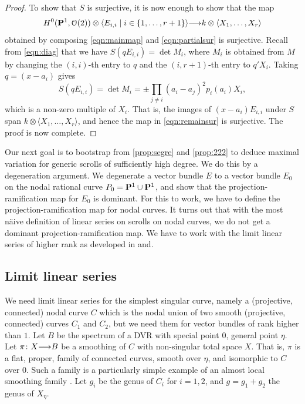 \documentclass[11pt,reqno]{amsart}
\theoremstyle{plain}
\theoremstyle{definition}
\theoremstyle{remark}
\numberwithin{equation}{section}
\renewcommand{\k}{k}
\renewcommand{\to}{{\longrightarrow}}
\numberwithin{equation}{section}
\renewcommand{\O}{\mathcal O}
\begin{document}
\begin{proof}
  To show that $S$ is surjective, it is now enough to show that the map
  \begin{equation}\label{eqn:remainsur}
    H^0(\P^1, \O(2)) \otimes \langle  E_{i,i} \mid i \in \{1, \dots, r+1\} \rangle \to \k \otimes \langle  X_1, \dots, X_r \rangle
  \end{equation}
  obtained by composing \eqref{eqn:mainmap} and \eqref{eqn:partialsur} is surjective.
  Recall from \eqref{eqn:diag} that we have $S(qE_{i,i}) = \det M_i$, where $M_i$ is obtained from $M$ by changing the $(i,i)$-th entry to $q$ and the $(i, r+1)$-th entry to $q'X_i$.
  Taking $q = (x-a_i)$ gives
  \[ S(qE_{i,i}) = \det M_i = \pm \prod_{j \neq i} (a_i-a_j)^2 p_i(a_i) X_i,\]
  which is a non-zero multiple of $X_i$.
  That is, the images of $(x-a_i)E_{i,i}$ under $S$ span $\k \otimes \langle  X_1, \dots, X_r \rangle$, and hence the map in \eqref{eqn:remainsur} is surjective.
  The proof is now complete.
\end{proof}

Our next goal is to bootstrap from \autoref{prop:segre} and \autoref{prop:222} to deduce maximal variation for generic scrolls of sufficiently high degree.
We do this by a degeneration argument.
We degenerate a vector bundle $E$ to a vector bundle $E_0$ on the nodal rational curve $P_0 = \P^1 \cup \P^1$, and show that the projection-ramification map for $E_0$ is dominant.
For this to work, we have to define the projection-ramification map for nodal curves.
It turns out that with the most n\"aive definition of linear series on scrolls on nodal curves, we do not get a dominant projection-ramification map.
We have to work with the limit linear series of higher rank as developed in \cite{tei-i-big:91} and\cite{oss:14}.

\subsection{Limit linear series}\label{sec:lls}
We need limit linear series for the simplest singular curve, namely a (projective, connected) nodal curve $C$ which is the nodal union of two smooth (projective, connected) curves $C_1$ and $C_2$, but we need them for vector bundles of rank higher than $1$.
Let $B$ be the spectrum of a DVR with special point $0$, general point $\eta$.
Let $\pi \from X \to B$ be a smoothing of $C$ with non-singular total space $X$.
That is, $\pi$ is a flat, proper, family of connected curves, smooth over $\eta$, and isomorphic to $C$ over $0$.
Such a family is a particularly simple example of an almost local smoothing family \cite[\S~2.1--2.2]{oss:14}.
Let $g_i$ be the genus of $C_i$ for $i = 1, 2$, and $g = g_1+g_2$ the genus of $X_\eta$.
\end{document}
